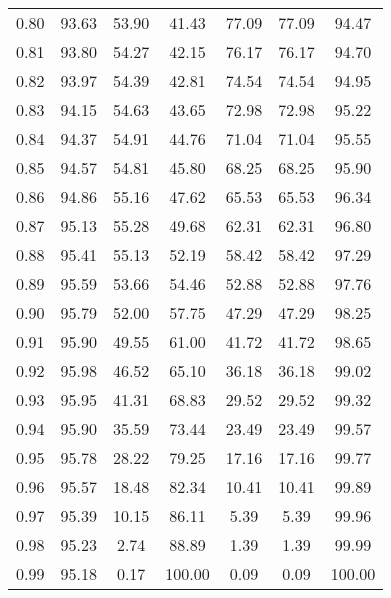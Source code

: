 \begin{tabular}{|c|c|c|c|c|c|c|}
      0.80 &     93.63 &     53.90 &      41.43 &   77.09 &      77.09 &         94.47 \\
      0.81 &     93.80 &     54.27 &      42.15 &   76.17 &      76.17 &         94.70 \\
      0.82 &     93.97 &     54.39 &      42.81 &   74.54 &      74.54 &         94.95 \\
      0.83 &     94.15 &     54.63 &      43.65 &   72.98 &      72.98 &         95.22 \\
      0.84 &     94.37 &     54.91 &      44.76 &   71.04 &      71.04 &         95.55 \\
      0.85 &     94.57 &     54.81 &      45.80 &   68.25 &      68.25 &         95.90 \\
      0.86 &     94.86 &     55.16 &      47.62 &   65.53 &      65.53 &         96.34 \\
      0.87 &     95.13 &     55.28 &      49.68 &   62.31 &      62.31 &         96.80 \\
      0.88 &     95.41 &     55.13 &      52.19 &   58.42 &      58.42 &         97.29 \\
      0.89 &     95.59 &     53.66 &      54.46 &   52.88 &      52.88 &         97.76 \\
      0.90 &     95.79 &     52.00 &      57.75 &   47.29 &      47.29 &         98.25 \\
      0.91 &     95.90 &     49.55 &      61.00 &   41.72 &      41.72 &         98.65 \\
      0.92 &     95.98 &     46.52 &      65.10 &   36.18 &      36.18 &         99.02 \\
      0.93 &     95.95 &     41.31 &      68.83 &   29.52 &      29.52 &         99.32 \\
      0.94 &     95.90 &     35.59 &      73.44 &   23.49 &      23.49 &         99.57 \\
      0.95 &     95.78 &     28.22 &      79.25 &   17.16 &      17.16 &         99.77 \\
      0.96 &     95.57 &     18.48 &      82.34 &   10.41 &      10.41 &         99.89 \\
      0.97 &     95.39 &     10.15 &      86.11 &    5.39 &       5.39 &         99.96 \\
      0.98 &     95.23 &      2.74 &      88.89 &    1.39 &       1.39 &         99.99 \\
      0.99 &     95.18 &      0.17 &     100.00 &    0.09 &       0.09 &        100.00 \\
\bottomrule
\end{tabular}
